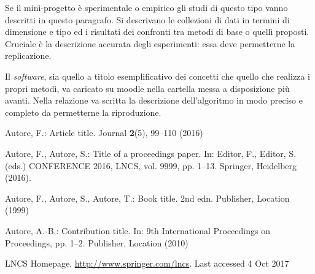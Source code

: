\documentclass[runningheads]{llncs}
\begin{document}
Se il mini-progetto \`e sperimentale o empirico gli studi di questo
tipo vanno descritti in questo paragrafo.  Si descrivano le collezioni
di dati in termini di dimensione e tipo ed i risultati dei confronti
tra metodi di base o quelli proposti.  Cruciale \`e la descrizione
accurata degli esperimenti: essa deve permetterne la replicazione.

Il \textit{software}, sia quello a titolo esemplificativo dei concetti
che quello che realizza i propri metodi, va caricato su moodle nella
cartella messa a disposizione pi\`u avanti.  Nella relazione va
scritta la descrizione dell'algoritmo in modo preciso e completo da
permetterne la riproduzione.

\begin{thebibliography}{8}
Autore, F.: Article title. Journal \textbf{2}(5), 99--110 (2016)

Autore, F., Autore, S.: Title of a proceedings paper. In: Editor,
F., Editor, S. (eds.) CONFERENCE 2016, LNCS, vol. 9999, pp. 1--13.
Springer, Heidelberg (2016). 

Autore, F., Autore, S., Autore, T.: Book title. 2nd edn. Publisher,
Location (1999)

Autore, A.-B.: Contribution title. In: 9th International Proceedings
on Proceedings, pp. 1--2. Publisher, Location (2010)

LNCS Homepage, \url{http://www.springer.com/lncs}. Last accessed 4
Oct 2017
\end{thebibliography}

\begin{figure}[h!]
\end{figure}
\end{document}
